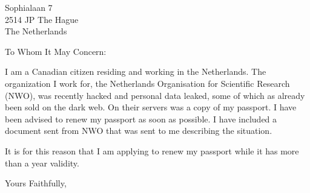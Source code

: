 \documentclass{letter}
\begin{document}
\begin{letter}{
    Sophialaan 7\\
    2514 JP The Hague\\
    The Netherlands}

\opening{To Whom It May Concern:}

I am a Canadian citizen residing and working in the Netherlands. The organization I work for, the Netherlands Organisation for Scientific Research (NWO), was recently hacked and personal data leaked, some of which as already been sold on the dark web. On their servers was a copy of my passport. I have been advised to renew my passport as soon as possible. I have included a document sent from NWO that was sent to me describing the situation.

It is for this reason that I am applying to renew my passport while it has more than a year validity.

\closing{Yours Faithfully,}

\end{letter}
\end{document}
